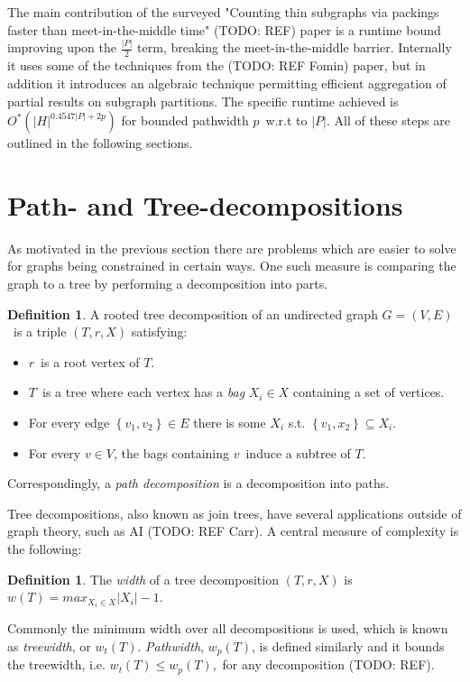\documentclass[a4paper,11pt]{report}
\theoremstyle{plain}
\theoremstyle{definition}
\newtheorem{defn}[thm]{Definition} %
\begin{document}
The main contribution of the surveyed "Counting thin subgraphs via packings faster than meet-in-the-middle time" (TODO: REF) paper
is a runtime bound improving upon the $\frac{|P|}{2}$ term, breaking the meet-in-the-middle barrier.
Internally it uses some of the techniques from the (TODO: REF Fomin) paper, but in addition it introduces an algebraic technique
permitting efficient aggregation of partial results on subgraph partitions.
The specific runtime achieved is $O^*(|H|^{0.4547|P| + 2p})$ for bounded pathwidth $p$ w.r.t to $|P|$.
All of these steps are outlined in the following sections.


\section{Path- and Tree-decompositions}
As motivated in the previous section there are problems which are easier to solve for graphs being constrained in certain ways.
One such measure is comparing the graph to a tree by performing a decomposition into parts.

\begin{defn}
A rooted tree decomposition of an undirected graph $G = (V, E)$ is a triple $(T, r, X)$ satisfying:
\begin{itemize}
\item $r$ is a root vertex of $T$.
\item $T$ is a tree where each vertex has a \emph{bag} $X_i \in X$ containing a set of vertices.
\item For every edge $\left\{v_1, v_2\right\} \in E$ there is some $X_i$ s.t. $\left\{v_1, x_2\right\} \subseteq X_i$.
\item For every $v \in V$, the bags containing $v$ induce a subtree of $T$.
\end{itemize}
\end{defn}

Correspondingly, a \emph{path decomposition} is a decomposition into paths.

Tree decompositions, also known as join trees, have several applications outside of graph theory, such as AI (TODO: REF Carr).
A central measure of complexity is the following:

\begin{defn}
The \emph{width} of a tree decomposition $(T, r, X)$ is $w(T) = max_{X_i \in X} |X_i| - 1$.
\end{defn}
Commonly the minimum width over all decompositions is used, which is known as \emph{treewidth}, or $w_t(T)$.
\emph{Pathwidth}, $w_p(T)$, is defined similarly and it bounds the treewidth, i.e. $w_t(T) \leq w_p(T)$, for any decomposition (TODO: REF).
\end{document}
